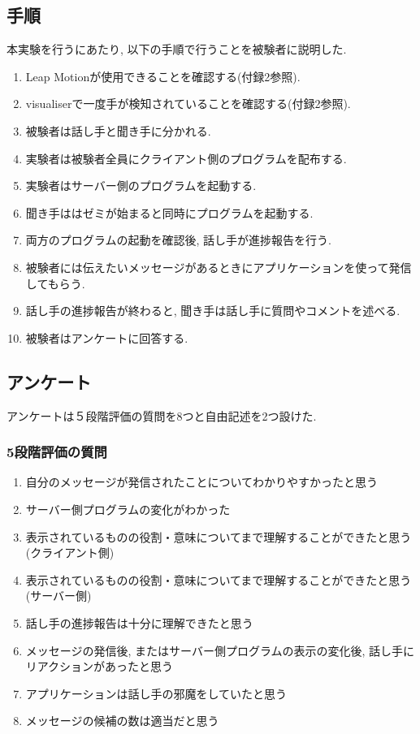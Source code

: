 \documentclass{funthesis}
\begin{document}
\subsection{手順}
本実験を行うにあたり, 以下の手順で行うことを被験者に説明した.  

\begin{enumerate}
\renewcommand{\labelenumi}{\arabic{enumi}}
 \item Leap Motionが使用できることを確認する(付録2参照).
 \item visualiserで一度手が検知されていることを確認する(付録2参照).
 \item 被験者は話し手と聞き手に分かれる. 
 \item 実験者は被験者全員にクライアント側のプログラムを配布する.
 \item 実験者はサーバー側のプログラムを起動する. 
 \item 聞き手ははゼミが始まると同時にプログラムを起動する. 
 \item 両方のプログラムの起動を確認後, 話し手が進捗報告を行う. 
 \item 被験者には伝えたいメッセージがあるときにアプリケーションを使って発信してもらう.
 \item 話し手の進捗報告が終わると, 聞き手は話し手に質問やコメントを述べる.
 \item 被験者はアンケートに回答する.
\end{enumerate}

\subsection{アンケート}
アンケートは５段階評価の質問を8つと自由記述を2つ設けた. \\
\subsubsection{5段階評価の質問}
\begin{enumerate}
\renewcommand{\labelenumi}{\arabic{enumi}}
 \item 自分のメッセージが発信されたことについてわかりやすかったと思う
 \item サーバー側プログラムの変化がわかった
 \item 表示されているものの役割・意味についてまで理解することができたと思う(クライアント側) 
 \item 表示されているものの役割・意味についてまで理解することができたと思う(サーバー側)
 \item 話し手の進捗報告は十分に理解できたと思う 
 \item メッセージの発信後, またはサーバー側プログラムの表示の変化後, 話し手にリアクションがあったと思う
 \item アプリケーションは話し手の邪魔をしていたと思う
 \item メッセージの候補の数は適当だと思う
\end{enumerate}
\end{document}
